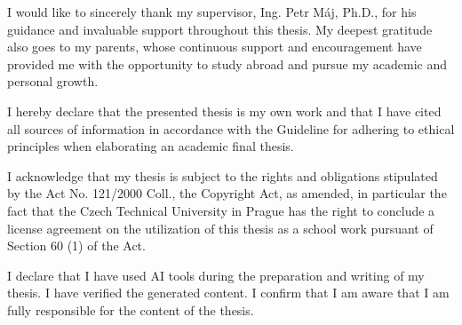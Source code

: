 \documentclass[english,bachelor,unicode,twoside]{ctufit-thesis}
\begin{document}
\frontmatter\frontmatterinit %

\thispagestyle{empty}\maketitle\thispagestyle{empty}\cleardoublepage %


\imprintpage %
\stopTOCentries

\begin{acknowledgmentpage}
    I would like to sincerely thank my supervisor, Ing. Petr Máj, Ph.D., for his guidance and invaluable support throughout this thesis. My deepest gratitude also goes to my parents, whose continuous support and encouragement have provided me with the opportunity to study abroad and pursue my academic and personal growth.
\end{acknowledgmentpage}


\begin{declarationpage}
I hereby declare that the presented thesis is my own work and that I have cited all sources of
information in accordance with the Guideline for adhering to ethical principles when elaborating an
academic final thesis.

I acknowledge that my thesis is subject to the rights and obligations stipulated by the Act No.
121/2000 Coll., the Copyright Act, as amended, in particular the fact that the Czech Technical
University in Prague has the right to conclude a license agreement on the utilization of this thesis as
a school work pursuant of Section 60 (1) of the Act.

I declare that I have used AI tools during the preparation and writing of my thesis. I have verified
the generated content. I confirm that I am aware that I am fully responsible for the content of the
thesis.
\end{declarationpage}
\end{document}

